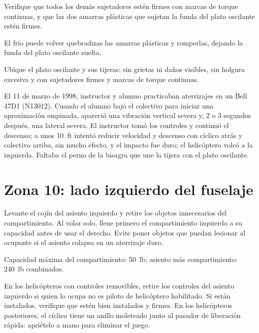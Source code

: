 Verifique que todos los demás sujetadores estén firmes con marcas de torque continuas, y que las dos amarras plásticas que sujetan la funda del plato oscilante estén firmes.

\begin{nota}
El frío puede volver quebradizas las amarras plásticas y romperlas, dejando la funda del plato oscilante suelta.
\end{nota}

Ubique el plato oscilante y sus tijeras: sin grietas ni daños visibles, sin holgura excesiva y con sujetadores firmes y marcas de torque continuas.

\begin{caso}
El 11 de marzo de 1998, instructor y alumno practicaban aterrizajes en un Bell 47D1 (N13012). Cuando el alumno bajó el colectivo para iniciar una aproximación empinada, apareció una vibración vertical severa y, 2 o 3 segundos después, una lateral severa. El instructor tomó los controles y continuó el descenso; a unos 10~ft intentó reducir velocidad y descenso con cíclico atrás y colectivo arriba, sin mucho efecto, y el impacto fue duro; el helicóptero volcó a la izquierda. Faltaba el perno de la bisagra que une la tijera con el plato oscilante.
\end{caso}

\section{Zona 10: lado izquierdo del fuselaje}

Levante el cojín del asiento izquierdo y retire los objetos innecesarios del compartimiento. Al volar solo, llene primero el compartimiento izquierdo a su capacidad antes de usar el derecho. Evite poner objetos que puedan lesionar al ocupante si el asiento colapsa en un aterrizaje duro.

\begin{nota}
Capacidad máxima del compartimiento: 50~lb; asiento más compartimiento: 240~lb combinados.
\end{nota}

En los helicópteros con controles removibles, retire los controles del asiento izquierdo si quien lo ocupa no es piloto de helicóptero habilitado. Si están instalados, verifique que estén bien instalados y firmes. En los helicópteros posteriores, el cíclico tiene un anillo moleteado junto al pasador de liberación rápida: apriételo a mano para eliminar el juego.

